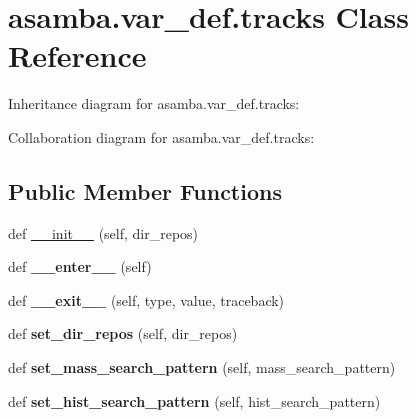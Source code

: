 \hypertarget{classasamba_1_1var__def_1_1tracks}{}\section{asamba.\+var\+\_\+def.\+tracks Class Reference}
\label{classasamba_1_1var__def_1_1tracks}


Inheritance diagram for asamba.\+var\+\_\+def.\+tracks\+:


Collaboration diagram for asamba.\+var\+\_\+def.\+tracks\+:
\subsection*{Public Member Functions}
\begin{DoxyCompactItemize}
\item 
def \hyperlink{classasamba_1_1var__def_1_1tracks_a317ae0c8a333fcbcf9e907f9f09d4c48}{\+\_\+\+\_\+init\+\_\+\+\_\+} (self, dir\+\_\+repos)
\item 
\mbox{\label{classasamba_1_1var__def_1_1tracks_a3fa0854d4982624b4a2f954c745e9f6d}} 
def {\bfseries \+\_\+\+\_\+enter\+\_\+\+\_\+} (self)
\item 
\mbox{\label{classasamba_1_1var__def_1_1tracks_a2f766da66983a7e055916b8a2c6d8c8b}} 
def {\bfseries \+\_\+\+\_\+exit\+\_\+\+\_\+} (self, type, value, traceback)
\item 
\mbox{\label{classasamba_1_1var__def_1_1tracks_acbfad91a58aad6c1d94d4697c5da07f2}} 
def {\bfseries set\+\_\+dir\+\_\+repos} (self, dir\+\_\+repos)
\item 
\mbox{\label{classasamba_1_1var__def_1_1tracks_a3a604a91219aee4ceefe39ec53a11909}} 
def {\bfseries set\+\_\+mass\+\_\+search\+\_\+pattern} (self, mass\+\_\+search\+\_\+pattern)
\item 
\mbox{\label{classasamba_1_1var__def_1_1tracks_ade5767a5bf3585e28b799c9f0293cc47}} 
def {\bfseries set\+\_\+hist\+\_\+search\+\_\+pattern} (self, hist\+\_\+search\+\_\+pattern)
\item 
\mbox{\label{classasamba_1_1var__def_1_1tracks_a9915164166bfc2053982747a020ba9e7}} 

\end{DoxyCompactItemize}
